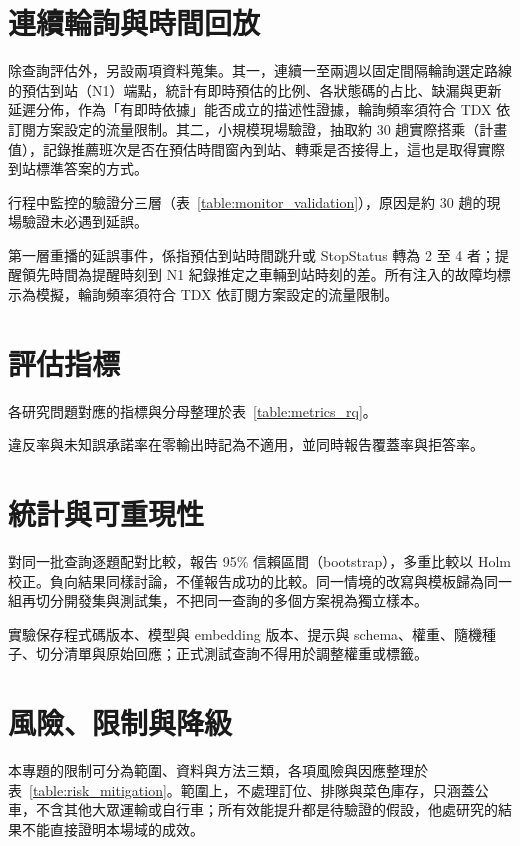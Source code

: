 \section{連續輪詢與時間回放}

除查詢評估外，另設兩項資料蒐集。其一，連續一至兩週以固定間隔輪詢選定路線的預估到站（N1）端點，統計有即時預估的比例、各狀態碼的占比、缺漏與更新延遲分佈，作為「有即時依據」能否成立的描述性證據，輪詢頻率須符合 TDX 依訂閱方案設定的流量限制。其二，小規模現場驗證，抽取約 30 趟實際搭乘（計畫值），記錄推薦班次是否在預估時間窗內到站、轉乘是否接得上，這也是取得實際到站標準答案的方式。

行程中監控的驗證分三層（表~\ref{table:monitor_validation}），原因是約 30 趟的現場驗證未必遇到延誤。



第一層重播的延誤事件，係指預估到站時間跳升或 StopStatus 轉為 2 至 4 者；提醒領先時間為提醒時刻到 N1 紀錄推定之車輛到站時刻的差。所有注入的故障均標示為模擬，輪詢頻率須符合 TDX 依訂閱方案設定的流量限制。


\section{評估指標}

各研究問題對應的指標與分母整理於表~\ref{table:metrics_rq}。



違反率與未知誤承諾率在零輸出時記為不適用，並同時報告覆蓋率與拒答率。


\section{統計與可重現性}

對同一批查詢逐題配對比較，報告 95\% 信賴區間（bootstrap），多重比較以 Holm 校正。負向結果同樣討論，不僅報告成功的比較。同一情境的改寫與模板歸為同一組再切分開發集與測試集，不把同一查詢的多個方案視為獨立樣本。

實驗保存程式碼版本、模型與 embedding 版本、提示與 schema、權重、隨機種子、切分清單與原始回應；正式測試查詢不得用於調整權重或標籤。


\section{風險、限制與降級}

本專題的限制可分為範圍、資料與方法三類，各項風險與因應整理於表~\ref{table:risk_mitigation}。範圍上，不處理訂位、排隊與菜色庫存，只涵蓋公車，不含其他大眾運輸或自行車；所有效能提升都是待驗證的假設，他處研究的結果不能直接證明本場域的成效。


